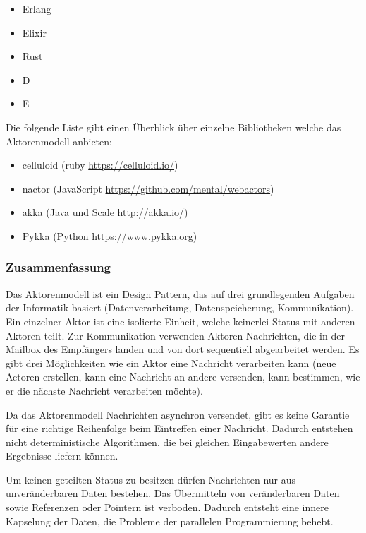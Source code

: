 \begin{itemize}
  \item Erlang
  \item Elixir
  \item Rust
  \item D
  \item E
\end{itemize}

Die folgende Liste gibt einen Überblick über einzelne Bibliotheken welche das Aktorenmodell anbieten:

\begin{itemize}
  \item celluloid (ruby \url{https://celluloid.io/})
  \item nactor (JavaScript \url{https://github.com/mental/webactors})
  \item akka (Java und Scale \url{http://akka.io/})
  \item Pykka (Python \url{https://www.pykka.org})
\end{itemize}



\subsubsection{Zusammenfassung}
Das Aktorenmodell ist ein Design Pattern, das auf drei grundlegenden Aufgaben der Informatik basiert (Datenverarbeitung, Datenspeicherung, Kommunikation). Ein einzelner Aktor ist eine isolierte Einheit, welche keinerlei Status mit anderen Aktoren teilt. Zur Kommunikation verwenden Aktoren Nachrichten, die in der Mailbox des Empfängers landen und von dort sequentiell abgearbeitet werden. Es gibt drei Möglichkeiten wie ein Aktor eine Nachricht verarbeiten kann (neue Actoren erstellen, kann eine Nachricht an andere versenden, kann bestimmen, wie er die nächste Nachricht verarbeiten möchte).

Da das Aktorenmodell Nachrichten asynchron versendet, gibt es keine Garantie für eine richtige Reihenfolge beim Eintreffen einer Nachricht. Dadurch entstehen nicht deterministische Algorithmen, die bei gleichen Eingabewerten andere Ergebnisse liefern können.

Um keinen geteilten Status zu besitzen dürfen Nachrichten nur aus unveränderbaren Daten bestehen. Das Übermitteln von veränderbaren Daten sowie Referenzen oder Pointern ist verboden. Dadurch entsteht eine innere Kapselung der Daten, die Probleme der parallelen Programmierung behebt.